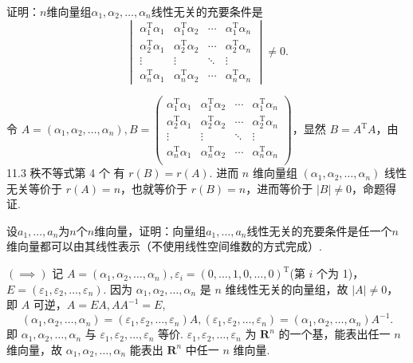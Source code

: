 \begin{exercise}
\begin{exgroup}
        \item 证明：$n$维向量组$\alpha_1,\alpha_2,\ldots,\alpha_n$线性无关的充要条件是
        \[\begin{vmatrix}
                \alpha_1^\mathrm{T}\alpha_1 & \alpha_1^\mathrm{T}\alpha_2 & \cdots & \alpha_1^\mathrm{T}\alpha_n \\
                \alpha_2^\mathrm{T}\alpha_1 & \alpha_2^\mathrm{T}\alpha_2 & \cdots & \alpha_2^\mathrm{T}\alpha_n \\
                \vdots                      & \vdots                      & \ddots & \vdots                      \\
                \alpha_n^\mathrm{T}\alpha_1 & \alpha_n^\mathrm{T}\alpha_2 & \cdots & \alpha_n^\mathrm{T}\alpha_n
            \end{vmatrix}\neq 0.\]
        \begin{answer}
            令 $A = (\alpha_1, \alpha_2, \ldots, \alpha_n), B = \begin{pmatrix}
                \alpha_1^{\mathrm{T}}\alpha_1 & \alpha_1^{\mathrm{T}}\alpha_2 & \cdots & \alpha_1^{\mathrm{T}}\alpha_n \\
                \alpha_2^{\mathrm{T}}\alpha_1 & \alpha_2^{\mathrm{T}}\alpha_2 & \cdots & \alpha_2^{\mathrm{T}}\alpha_n \\
                \vdots                        & \vdots                        & \ddots & \vdots                        \\
                \alpha_n^{\mathrm{T}}\alpha_1 & \alpha_n^{\mathrm{T}}\alpha_2 & \cdots & \alpha_n^{\mathrm{T}}\alpha_n \\
            \end{pmatrix}$，显然 $B = A^{\mathrm{T}}A$，由 {11.3 秩不等式第 4 个} 有 $r(B) = r(A)$. 进而 $n$ 维向量组 $(\alpha_1, \alpha_2, \ldots, \alpha_n)$ 线性无关等价于 $r(A) = n$，也就等价于 $r(B) = n$，进而等价于 $\lvert B \rvert \neq 0$，命题得证. %
        \end{answer}

        \item 设$a_1,\ldots,a_n$为$n$个$n$维向量，证明：向量组$a_1,\ldots,a_n$线性无关的充要条件是任一个$n$维向量都可以由其线性表示（不使用线性空间维数的方式完成）.
        \begin{answer}
            $(\implies)$ 记 $A = (\alpha_1, \alpha_2, \ldots, \alpha_n), \varepsilon_i = (0, \ldots, 1, 0, \ldots, 0)^{\mathrm{T}}$(第 $i$ 个为 1)，$E = (\varepsilon_1, \varepsilon_2, \ldots, \varepsilon_n)$. 因为 $\alpha_1, \alpha_2, \ldots, \alpha_n$ 是 $n$ 维线性无关的向量组，故 $\lvert A \rvert \neq 0$，即 $A$ 可逆，$A = EA, AA^{-1} = E$,\[(\alpha_1, \alpha_2, \ldots, \alpha_n) = (\varepsilon_1, \varepsilon_2, \ldots, \varepsilon_n)A, (\varepsilon_1, \varepsilon_2, \ldots, \varepsilon_n) = (\alpha_1, \alpha_2, \ldots, \alpha_n)A^{-1}.\] 即 $\alpha_1, \alpha_2, \ldots, \alpha_n$ 与 $\varepsilon_1, \varepsilon_2, \ldots, \varepsilon_n$ 等价. $\varepsilon_1, \varepsilon_2, \ldots, \varepsilon_n$ 为 $\mathbf{R}^n$ 的一个基，能表出任一 $n$ 维向量，故 $\alpha_1, \alpha_2, \ldots, \alpha_n$ 能表出 $\mathbf{R}^n$ 中任一 $n$ 维向量.


\end{answer}
\end{exgroup}
\end{exercise}
